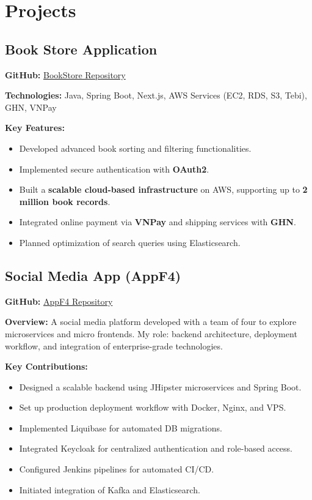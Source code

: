 \documentclass[11pt,a4paper]{article}
\begin{document}
\section{Projects}
\begin{adjustwidth}{2em}{}
\subsection{Book Store Application}

\textbf{GitHub:} \href{https://github.com/shegga9x/book-store-app}{BookStore Repository}

\textbf{Technologies:} Java, Spring Boot, Next.js, AWS Services (EC2, RDS, S3, Tebi), GHN, VNPay

\textbf{Key Features:}
\begin{itemize}[leftmargin=*]
    \item Developed advanced book sorting and filtering functionalities.
    \item Implemented secure authentication with \textbf{OAuth2}.
    \item Built a \textbf{scalable cloud-based infrastructure} on AWS, supporting up to \textbf{2 million book records}.
    \item Integrated online payment via \textbf{VNPay} and shipping services with \textbf{GHN}.
    \item Planned optimization of search queries using Elasticsearch.
\end{itemize}

\vspace{1em}

\subsection{Social Media App (AppF4)}

\textbf{GitHub:} \href{https://github.com/shegga9x/appf4}{AppF4 Repository}


\textbf{Overview:} A social media platform developed with a team of four to explore microservices and micro frontends. My role: backend architecture, deployment workflow, and integration of enterprise-grade technologies.

\textbf{Key Contributions:}
\begin{itemize}[leftmargin=*]
    \item Designed a scalable backend using JHipster microservices and Spring Boot.
    \item Set up production deployment workflow with Docker, Nginx, and VPS.
    \item Implemented Liquibase for automated DB migrations.
    \item Integrated Keycloak for centralized authentication and role-based access.
    \item Configured Jenkins pipelines for automated CI/CD.
    \item Initiated integration of Kafka and Elasticsearch.
\end{itemize}


\end{adjustwidth}
\end{document}
